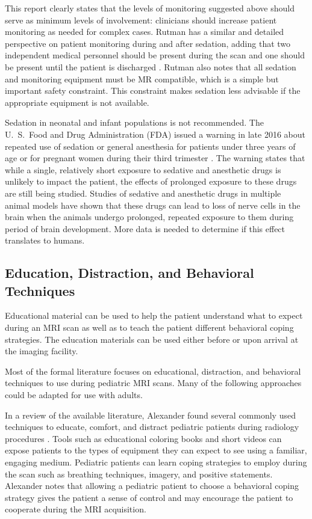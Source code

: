 \noindent This report clearly states that the levels of monitoring suggested above should serve as minimum levels of involvement: clinicians should increase patient monitoring as needed for complex cases. Rutman has a similar and detailed perspective on patient monitoring during and after sedation, adding that two independent medical personnel should be present during the scan and one should be present until the patient is discharged \cite{Rutman2009}. Rutman also notes that all sedation and monitoring equipment must be MR compatible, which is a simple but important safety constraint. This constraint makes sedation less advisable if the appropriate equipment is not available.

Sedation in neonatal and infant populations is not recommended. The  U.~S.~Food and Drug Administration (FDA) issued a warning in late 2016 about repeated use of sedation or general anesthesia for patients under three years of age or for pregnant women during their third trimester \cite{FDA2016}. The warning states that while a single, relatively short exposure to sedative and anesthetic drugs is unlikely to impact the patient, the effects of prolonged exposure to these drugs are still being studied. Studies of sedative and anesthetic drugs in multiple animal models have shown that these drugs can lead to loss of nerve cells in the brain when the animals undergo prolonged, repeated exposure to them during period of brain development. More data is needed to determine if this effect translates to humans.

\subsection{Education, Distraction, and Behavioral Techniques}

Educational material can be used to help the patient understand what to expect during an MRI scan as well as to teach the patient different behavioral coping strategies. The education materials can be used either before or upon arrival at the imaging facility. 

Most of the formal literature focuses on educational, distraction, and behavioral techniques to use during pediatric MRI scans. Many of the following approaches could be adapted for use with adults.

In a review of the available literature, Alexander found several commonly used techniques to educate, comfort, and distract pediatric patients during radiology procedures \cite{Alexander2012}. Tools such as educational coloring books and short videos can expose patients to the types of equipment they can expect to see using a familiar, engaging medium. Pediatric patients can learn coping strategies to employ during the scan such as breathing techniques, imagery, and positive statements. Alexander notes that allowing a pediatric patient to choose a behavioral coping strategy gives the patient a sense of control and may encourage the patient to cooperate during the MRI acquisition.


